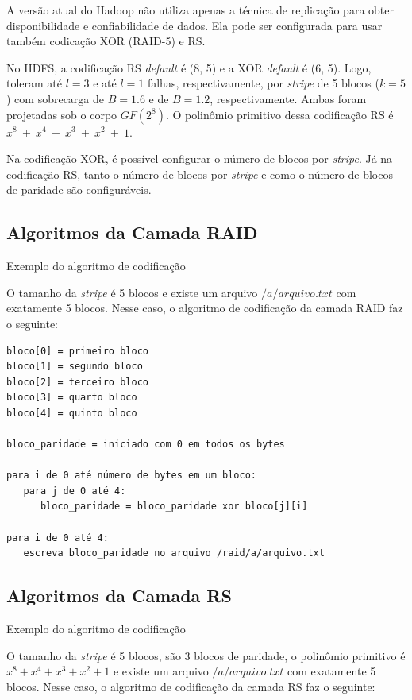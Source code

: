 A versão atual do Hadoop não utiliza apenas a técnica de replicação
\cite{White:2009} para obter disponibilidade e confiabilidade de
dados. Ela pode ser configurada para usar também  codicação XOR (RAID-5) e RS.

No HDFS, a codificação RS \emph{default} é (8, 5) e a XOR \emph{default} é (6, 5).  Logo, toleram até $l=3$ e até $l=1$ falhas, respectivamente, por \emph{stripe} de 5 blocos ($k=5$) com sobrecarga de $B=1.6$ e de $B=1.2$, respectivamente. Ambas foram projetadas sob o corpo $GF(2^8)$. O polinômio primitivo dessa codificação RS é $x^8\ +\ x^4\ +\ x^3\ +\ x^2\ +\ 1$.

Na codificação XOR, é possível configurar o número de blocos por \emph{stripe}. Já na codificação RS, tanto o número de blocos por \emph{stripe} e como o número de blocos de paridade são configuráveis.

\subsection{Algoritmos da Camada RAID}

Exemplo do algoritmo de codificação

O tamanho da \emph{stripe} é 5 blocos e existe um arquivo $/a/arquivo.txt$ com exatamente 5 blocos. Nesse caso, o algoritmo de codificação da camada RAID faz o seguinte:

\begin{verbatim}
bloco[0] = primeiro bloco
bloco[1] = segundo bloco
bloco[2] = terceiro bloco
bloco[3] = quarto bloco
bloco[4] = quinto bloco

bloco_paridade = iniciado com 0 em todos os bytes

para i de 0 até número de bytes em um bloco:
   para j de 0 até 4:
      bloco_paridade = bloco_paridade xor bloco[j][i]

para i de 0 até 4:
   escreva bloco_paridade no arquivo /raid/a/arquivo.txt
\end{verbatim}

\subsection{Algoritmos da Camada RS}

Exemplo do algoritmo de codificação

O tamanho da \emph{stripe} é 5 blocos, são 3 blocos de paridade, o polinômio primitivo é $x^8 + x^4 + x^3 + x^2 + 1$ e existe um arquivo $/a/arquivo.txt$ com exatamente 5 blocos. Nesse caso, o algoritmo de codificação da camada RS faz o seguinte:

